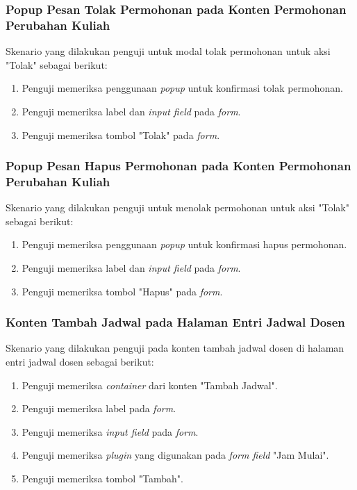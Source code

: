 \subsubsection{Popup Pesan Tolak Permohonan pada Konten Permohonan Perubahan Kuliah}
Skenario yang dilakukan penguji untuk modal tolak permohonan untuk aksi "Tolak" sebagai berikut:
\begin{enumerate}
	\item Penguji memeriksa penggunaan \textit{popup} untuk konfirmasi tolak permohonan.
	\item Penguji memeriksa label dan \textit{input field} pada \textit{form}.
	\item Penguji memeriksa tombol "Tolak" pada \textit{form}.	
\end{enumerate}

\subsubsection{Popup Pesan Hapus Permohonan pada Konten Permohonan Perubahan Kuliah}
Skenario yang dilakukan penguji untuk menolak permohonan untuk aksi "Tolak" sebagai berikut:
\begin{enumerate}
	\item Penguji memeriksa penggunaan \textit{popup} untuk konfirmasi hapus permohonan.
	\item Penguji memeriksa label dan \textit{input field} pada \textit{form}.
	\item Penguji memeriksa tombol "Hapus" pada \textit{form}.	
\end{enumerate}

\subsubsection{Konten Tambah Jadwal pada Halaman Entri Jadwal Dosen}
Skenario yang dilakukan penguji pada konten tambah jadwal dosen di halaman entri jadwal dosen sebagai berikut:
\begin{enumerate}
	\item Penguji memeriksa \textit{container} dari konten "Tambah Jadwal".	
	\item Penguji memeriksa label pada \textit{form}. 
	\item Penguji memeriksa \textit{input field} pada \textit{form}.
	\item Penguji memeriksa \textit{plugin} yang digunakan pada \textit{form field} "Jam Mulai".
	\item Penguji memeriksa tombol "Tambah".
\end{enumerate}

